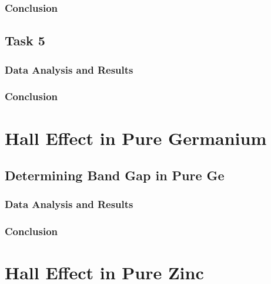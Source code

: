 \documentclass[a4paper]{article}
\begin{document}
\subsubsection{Conclusion}

\subsection{Task 5}

\subsubsection{Data Analysis and Results}

\subsubsection{Conclusion}

\section{Hall Effect in Pure Germanium}

\subsection{Determining Band Gap in Pure Ge}

\subsubsection{Data Analysis and Results}

\subsubsection{Conclusion}

\section{Hall Effect in Pure Zinc}
\end{document}
